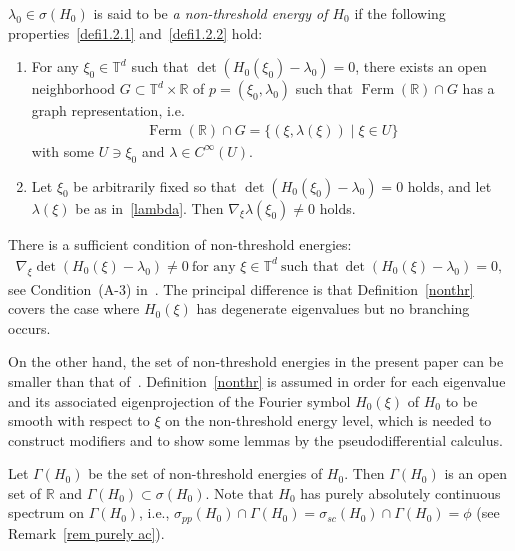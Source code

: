 \documentclass[AHL,Unicode,longabstracts,published]{cedram}
\renewcommand{\l}{\lambda}
\newcommand{\x}{\xi}
\newcommand{\s}{\sigma}
\newcommand{\R}{\mathbb{R}}
\newcommand{\T}{\mathbb{T}}
\DeclareMathOperator{\Ferm}{Ferm}
\newcommand{\R}{\mathbb{R}}
\begin{document}
\begin{defi}\label{nonthr}
$\l_0\in\s(H_0)$ is said to be \emph{a non-threshold energy of $H_0$} if the following properties~\eqref{defi1.2.1} and~\eqref{defi1.2.2} hold:
\begin{enumerate}
\item\label{defi1.2.1} For any $\x_0\in\T^d$ such that $\det(H_0(\x_0)-\l_0)=0$, there exists an open neighborhood $G \subset \T^d \times \R$ of $p=(\x_0,\l_0)$ such that $\Ferm(\R) \cap G$ has a graph representation, i.e.
\begin{align}\label{lambda}
\Ferm(\R) \cap G = \{(\x,\l(\x)) \mid \x\in U \}
\end{align}
with some $U\ni \x_0$ and $\l\in C^\infty(U)$.

\item\label{defi1.2.2} Let $\x_0$ be arbitrarily fixed so that $\det(H_0(\x_0)-\l_0)=0$ holds, and let $\l(\x)$ be as in~\eqref{lambda}. Then $\nabla_\x \l(\x_0) \neq 0$ holds.
\end{enumerate}
\end{defi}

\begin{rema}
There is a sufficient condition of non-threshold energies:
\begin{align*}
\nabla_\x \det(H_0(\x)-\l_0)\neq0 \ \text{for any } \x\in\T^d \ \text{such that} \ \det(H_0(\x)-\l_0)=0,
\end{align*}
see Condition~(A-3) in~\cite[Sections~6~and~7]{An-I-M}. The principal difference is that Definition~\ref{nonthr} covers the case where $H_0(\x)$ has degenerate eigenvalues but no branching occurs.

On the other hand, the set of non-threshold energies in the present paper can be smaller than that of~\cite[Definition~5.5]{P-R}. Definition~\ref{nonthr} is assumed in order for each eigenvalue and its associated eigenprojection of the Fourier symbol $H_0(\x)$ of $H_0$ to be smooth with respect to $\x$ on the non-threshold energy level, which is needed to construct modifiers and to show some lemmas by the pseudodifferential calculus.
\end{rema}

Let $\Gamma(H_0)$ be the set of non-threshold energies of $H_0$. Then $\Gamma(H_0)$ is an open set of $\R$ and $\Gamma(H_0) \subset \s(H_0)$. Note that $H_0$ has purely absolutely continuous spectrum on $\Gamma(H_0)$, i.e., $\s_{pp}(H_0)\cap \Gamma(H_0)=\s_{sc}(H_0)\cap \Gamma(H_0)=\phi$ (see Remark~\ref{rem purely ac}).
\end{document}
